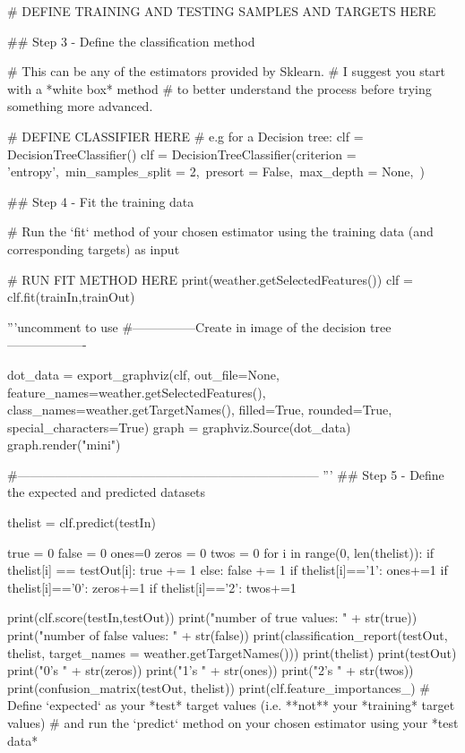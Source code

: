 \documentclass[12pt]{article}
\begin{document}
\begin{python}
# DEFINE TRAINING AND TESTING SAMPLES AND TARGETS HERE

## Step 3 - Define the classification method

# This can be any of the estimators provided by Sklearn.
# I suggest you start with a *white box* method
# to better understand the process before trying something more advanced.

# DEFINE CLASSIFIER HERE
# e.g for a Decision tree: clf = DecisionTreeClassifier()
clf = DecisionTreeClassifier(criterion = 'entropy',\
                            min_samples_split = 2,\
                            presort = False,\
                            max_depth = None,\
                            )


## Step 4 - Fit the training data

# Run the `fit` method of your chosen estimator using the training data (and corresponding targets) as input

# RUN FIT METHOD HERE
print(weather.getSelectedFeatures())
clf = clf.fit(trainIn,trainOut)

'''uncomment to use
#---------------Create in image of the decision tree-------------------

dot_data = export_graphviz(clf, out_file=None, feature_names=weather.getSelectedFeatures(), class_names=weather.getTargetNames(), filled=True, rounded=True, special_characters=True)
graph = graphviz.Source(dot_data)
graph.render("mini")

#------------------------------------------------------------------------
'''
## Step 5 - Define the expected and predicted datasets


thelist = clf.predict(testIn)




true = 0
false = 0
ones=0
zeros = 0
twos = 0
for i in range(0, len(thelist)):
    if thelist[i] == testOut[i]:
        true += 1
    else:
        false += 1
    if thelist[i]=='1':
        ones+=1
    if thelist[i]=='0':
        zeros+=1
    if thelist[i]=='2':
        twos+=1


print(clf.score(testIn,testOut))
print("number of true values: " + str(true))
print("number of false values: " + str(false))
print(classification_report(testOut, thelist, target_names = weather.getTargetNames()))
print(thelist)
print(testOut)
print("0's " + str(zeros))
print("1's " + str(ones))
print("2's " + str(twos))
print(confusion_matrix(testOut, thelist))
print(clf.feature_importances_)
# Define `expected` as your *test* target values (i.e. **not** your *training* target values)
# and run the `predict` method on your chosen estimator using your *test data*


\end{python}
\end{document}
